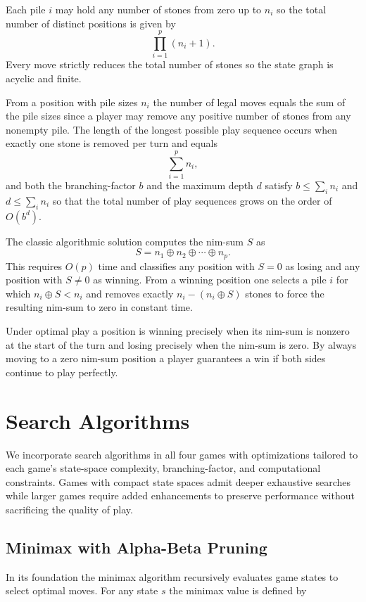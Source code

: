 \documentclass[12pt]{article}
\begin{document}
Each pile \(i\) may hold any number of stones from zero up to \(n_i\) so the total number of distinct positions is given by  
\[
\prod_{i=1}^p (n_i + 1).
\]
Every move strictly reduces the total number of stones so the state graph is acyclic and finite.

From a position with pile sizes \(n_i\) the number of legal moves equals the sum of the pile sizes since a player may remove any positive number of stones from any nonempty pile. The length of the longest possible play sequence occurs when exactly one stone is removed per turn and equals  
\[
\sum_{i=1}^p n_i,
\]
and both the \gls{branching-factor} \(b\) and the maximum depth \(d\) satisfy \(b \le \sum_i n_i\) and \(d \le \sum_i n_i\) so that the total number of play sequences grows on the order of \(O(b^d)\).

The classic algorithmic solution computes the \gls{nim-sum} \(S\) as  
\[
S = n_1 \oplus n_2 \oplus \cdots \oplus n_p.
\]
This requires \(O(p)\) time and classifies any position with \(S = 0\) as losing and any position with \(S \neq 0\) as winning. From a winning position one selects a pile \(i\) for which \(n_i \oplus S < n_i\) and removes exactly \(n_i - (n_i \oplus S)\) stones to force the resulting nim-sum to zero in constant time.

Under optimal play a position is winning precisely when its nim-sum is nonzero at the start of the turn and losing precisely when the nim-sum is zero. By always moving to a zero nim-sum position a player guarantees a win if both sides continue to play perfectly.

\section{Search Algorithms}

We incorporate search algorithms in all four games with optimizations tailored to each game’s state-space complexity, \gls{branching-factor}, and computational constraints. Games with compact state spaces admit deeper exhaustive searches while larger games require added enhancements to preserve performance without sacrificing the quality of play.

\subsection{Minimax with Alpha-Beta Pruning}

In its foundation the minimax algorithm recursively evaluates game states to select optimal moves. For any state \(s\) the minimax value is defined by
\end{document}
